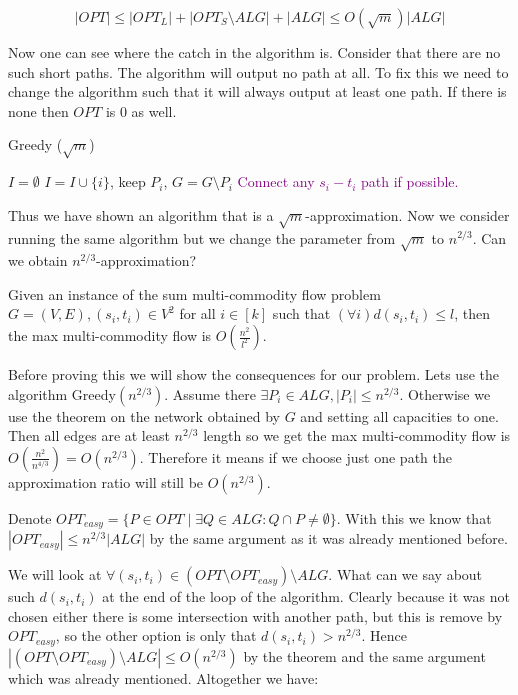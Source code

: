 $$
|OPT| \leq |OPT_{L}| + |OPT_{S} \setminus ALG| + |ALG| \leq O(\sqrt{m}) |ALG|
$$

Now one can see where the catch in the algorithm is. Consider that there are no such short paths. The algorithm will output no path at all. To fix this we need to change the algorithm such that it will always output at least one path. If there is none then $OPT$ is 0 as well.

\begin{algorithm}
	\caption{Greedy ($\sqrt{m}$)}
	\begin{algorithmic}[1]
		\State $I = \emptyset$
		\State $I = I \cup \{i\}$, keep $P_{i}$, $G = G \setminus P_{i}$
		\EndWhile
		\If{\textcolor{purple}{$I = \emptyset$}}
			\State \textcolor{purple}{Connect any $s_{i}-t_{i}$ path if possible.}
		\EndIf
	\end{algorithmic}
\end{algorithm}

Thus we have shown an algorithm that is a $\sqrt{m}$-approximation. Now we consider running the same algorithm but we change the parameter from $\sqrt{m}$ to $n^{2/3}$. Can we obtain $n^{2/3}$-approximation?

\begin{thm}
	Given an instance of the sum multi-commodity flow problem $G =(V,E), (s_{i}, t_{i}) \in V^2$ for all $i \in [k]$ such that $(\forall i) d(s_{i}, t_{i}) \leq l$, then the max multi-commodity flow is $O(\frac{n^2}{l^2})$.
\end{thm}

Before proving this we will show the consequences for our problem. Lets use the algorithm Greedy$(n^{2/3})$. Assume there $\exists P_{i} \in ALG, |P_{i}| \leq n^{2/3}$. Otherwise we use the theorem on the network obtained by $G$ and setting all capacities to one. Then all edges are at least $n^{2/3}$ length so we get the max multi-commodity flow is $O(\frac{n^{2}}{n^{4/3}}) = O(n^{2/3})$. Therefore it means if we choose just one path the approximation ratio will still be $O(n^{2/3})$.

Denote $OPT_{easy} = \{P \in OPT \mid \exists Q \in ALG : Q \cap P \neq \emptyset\}$. With this we know that $|OPT_{easy}| \leq n^{2/3} |ALG|$ by the same argument as it was already mentioned before.

We will look at $\forall (s_{i}, t_{i}) \in (OPT \setminus OPT_{easy}) \setminus ALG$. What can we say about such $d(s_{i}, t_{i})$ at the end of the loop of the algorithm. Clearly because it was not chosen either there is some intersection with another path, but this is remove by $OPT_{easy}$, so the other option is only that $d(s_{i}, t_{i}) > n^{2/3}$. Hence $|(OPT \setminus OPT_{easy}) \setminus ALG| \leq O(n^{2/3})$ by the theorem and the same argument which was already mentioned. Altogether we have:


